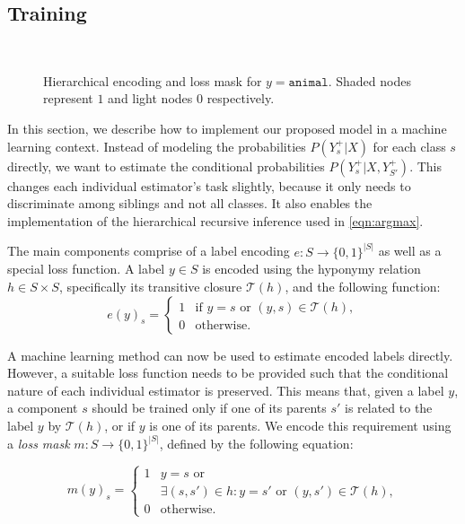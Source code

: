 \documentclass[10pt,twocolumn,letterpaper]{article}
\begin{document}
\subsection{Training}
\label{sec:loss}
\begin{figure}[t]
  \begin{center}
  \\
  \caption{Hierarchical encoding and loss mask for $y=\texttt{animal}$. Shaded
  nodes represent $1$ and light nodes $0$ respectively.}
  \label{fig:henc}
  \end{center}
\end{figure}
In this section, we describe how to implement our proposed model in a machine learning context.
Instead of modeling the probabilities $P(Y_s^+|X)$ for each class $s$ directly, we want to estimate
the conditional probabilities $P(Y_s^+|X, Y_{S'}^+)$. This changes each individual estimator's task
slightly, because it only needs to discriminate among siblings and not all classes. It also enables the implementation of
the hierarchical recursive inference used in \cref{eqn:argmax}.

The main components comprise of a label encoding $e: S \to \{0,1\}^{|S|}$ as well as a special loss function.
A label $y \in S$ is encoded using the hyponymy relation $h \in S \times S$, specifically its transitive
closure $\mathcal{T}(h)$, and the following function:
\begin{equation}
e(y)_s = \begin{cases}
1 & \text{if }y = s\text{ or }(y,s) \in \mathcal{T}(h),\\
0 & \text{otherwise}. 
\end{cases}
\end{equation}

A machine learning method can now be used to estimate encoded labels directly. However,
a suitable loss function needs to be provided such that the conditional nature of each
individual estimator is preserved. This means that, given a label $y$, a component $s$ should be trained only
if one of its parents $s'$ is related to the label $y$ by $\mathcal{T}(h)$, or if $y$ is one of its parents.
We encode this requirement using a \emph{loss mask} $m: S \to \{0,1\}^{|S|}$, defined by the
following equation:

\begin{equation}
m(y)_s = \begin{cases}
1 & \text{$y=s$ or} \\
 & \exists (s,s') \in h: y = s' \text{ or }(y,s') \in \mathcal{T}(h),\\
0 & \text{otherwise}. 
\end{cases}
\end{equation}
\end{document}
